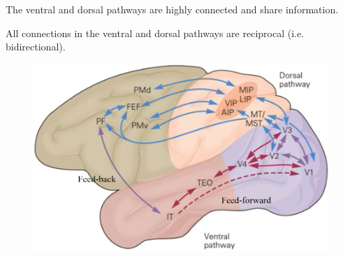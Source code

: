 \begin{remark}
    The ventral and dorsal pathways are highly connected and share information.
\end{remark}

\begin{remark}
    All connections in the ventral and dorsal pathways are reciprocal (i.e. bidirectional).
\end{remark}

\begin{figure}[H]
    \centering
    \includegraphics[width=0.4\linewidth]{./img/ventral_dorsal_pathways.png}
\end{figure}



